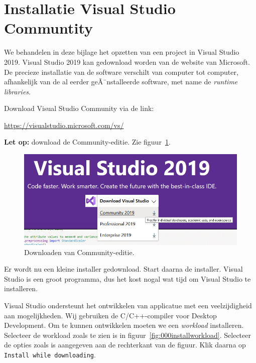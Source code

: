 \documentclass[a4paper,10pt,fleqn,twoside]{article}
\begin{document}


\appendix

\clearpage
\section{Installatie Visual Studio Communtity}
\label{sec:installatievsc}
We behandelen in deze bijlage het opzetten van een project in Visual Studio 2019. Visual Studio 2019 kan gedownload worden van de website van Microsoft. De precieze installatie van de software verschilt van computer tot computer, afhankelijk van de al eerder geÃ¯nstalleerde software, met name de \textsl{runtime libraries}.

Download Visual Studio Community via de link:

\hspace*{1em}\url{https://visualstudio.microsoft.com/vs/}

\textbf{Let op:} download de Community-editie. Zie figuur~\ref{fig:000Adownloadcommunity}.

\begin{figure}[H]
\centering
\includegraphics[scale=0.3]{000Adownloadcommunity}
\caption{Downloaden van Community-editie.}
\label{fig:000Adownloadcommunity}
\end{figure}

Er wordt nu een kleine installer gedownload. Start daarna de installer. Visual Studio is een groot programma, dus het kost nogal wat tijd om Visual Studio te installeren.

Visual Studio ondersteunt het ontwikkelen van applicatue met een veelzijdigheid aan mogelijkheden. Wij gebruiken de C/C++-compiler voor Desktop Development. Om te kunnen ontwikkelen moeten we een \textsl{workload} installeren. Selecteer de workload zoals te zien is in figuur~\ref{fig:000installworkload}. Selecteer de opties zoals is aangegeven aan de rechterkant van de figuur. Klik daarna op \texttt{Install while downloading}.
\end{document}
